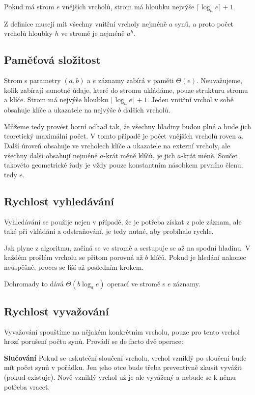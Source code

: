 \documentclass[a4paper,11pt,openany]{article}
\begin{document}
Pokud má strom $e$ vnějších vrcholů, strom má hloubku nejvýše $\lceil\log_a e\rceil + 1$.

Z definice musejí mít všechny vnitřní vrcholy nejméně $a$ synů, a proto počet vrcholů hloubky $h$ ve stromě je nejméně $a^h$.

\subsection{Paměťová složitost}

Strom s parametry $(a,b)$ a $e$ záznamy zabírá v paměti $\Theta(e)$. Neuvažujeme, kolik zabírají samotné údaje, které do stromu ukládáme, pouze strukturu stromu a klíče. Strom má nejvýše hloubku $\lceil\log_a e\rceil + 1$. Jeden vnitřní vrchol v sobě obsahuje klíče a ukazatele na nejvýše $b$ dalších vrcholů. 

Můžeme tedy provést horní odhad tak, že všechny hladiny budou plné a bude jich teoretický maximální počet. V tomto případě je počet vnějších vrcholů roven $a$. Další úroveň obsahuje ve vrcholech klíče a ukazatele na externí vrcholy, ale všechny další obsahují nejméně $a$-krát méně klíčů, je jich $a$-krát méně. Součet takovéto geometrické řady je vždy pouze konstantním násobkem prvního členu, tedy $e$.

\subsection{Rychlost vyhledávání}

Vyhledávání se použije nejen v případě, že je potřeba získat z pole záznam, ale také při vkládání a odstraňování, je tedy nutné, aby probíhalo rychle. 

Jak plyne z algoritmu, začíná se ve stromě a sestupuje se až na spodní hladinu. V každém prošlém vrcholu se přitom porovná až $b$ klíčů. Pokud je hledání nakonec neúspěšné, proces se liší až posledním krokem.

Dohromady to dává $ \Theta(b\log_a e) $ operací ve stromě s $e$ záznamy.

\subsection{Rychlost vyvažování}

Vyvažování spouštíme na nějakém konkrétním vrcholu, pouze pro tento vrchol hrozí porušení počtu synů. Provádí se de facto dvě operace:

\textbf{Slučování} Pokud se uskuteční sloučení vrcholu, vrchol vzniklý po sloučení bude mít počet synů v pořádku. Jen jeho otce bude třeba preventivně zkusit vyvážit (pokud existuje). Nově vzniklý vrchol už je ale vyvážený a nebude se k němu potřeba vracet.
\end{document}
